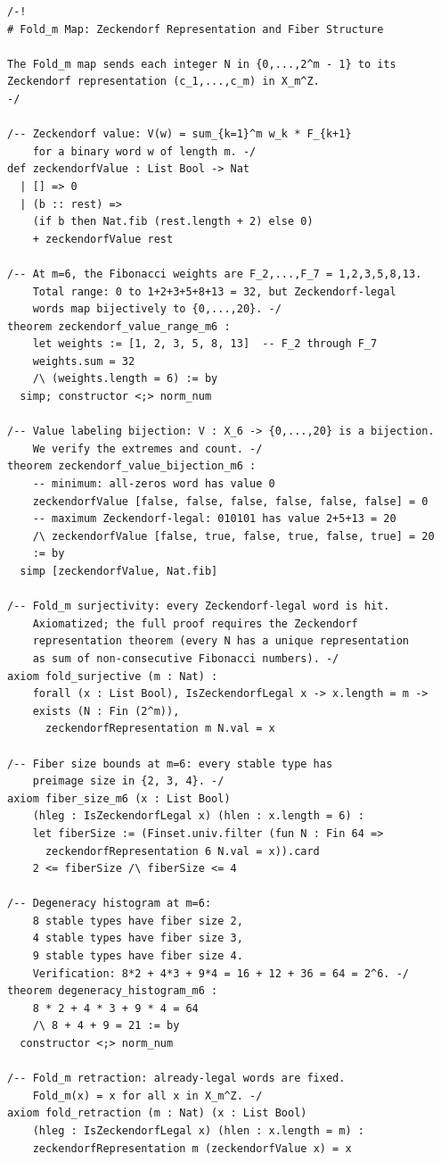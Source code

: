 \begin{lstlisting}[language=Lean4,caption={Fold$_m$ map and fiber structure}]
/-!
# Fold_m Map: Zeckendorf Representation and Fiber Structure

The Fold_m map sends each integer N in {0,...,2^m - 1} to its
Zeckendorf representation (c_1,...,c_m) in X_m^Z.
-/

/-- Zeckendorf value: V(w) = sum_{k=1}^m w_k * F_{k+1}
    for a binary word w of length m. -/
def zeckendorfValue : List Bool -> Nat
  | [] => 0
  | (b :: rest) =>
    (if b then Nat.fib (rest.length + 2) else 0)
    + zeckendorfValue rest

/-- At m=6, the Fibonacci weights are F_2,...,F_7 = 1,2,3,5,8,13.
    Total range: 0 to 1+2+3+5+8+13 = 32, but Zeckendorf-legal
    words map bijectively to {0,...,20}. -/
theorem zeckendorf_value_range_m6 :
    let weights := [1, 2, 3, 5, 8, 13]  -- F_2 through F_7
    weights.sum = 32
    /\ (weights.length = 6) := by
  simp; constructor <;> norm_num

/-- Value labeling bijection: V : X_6 -> {0,...,20} is a bijection.
    We verify the extremes and count. -/
theorem zeckendorf_value_bijection_m6 :
    -- minimum: all-zeros word has value 0
    zeckendorfValue [false, false, false, false, false, false] = 0
    -- maximum Zeckendorf-legal: 010101 has value 2+5+13 = 20
    /\ zeckendorfValue [false, true, false, true, false, true] = 20
    := by
  simp [zeckendorfValue, Nat.fib]

/-- Fold_m surjectivity: every Zeckendorf-legal word is hit.
    Axiomatized; the full proof requires the Zeckendorf
    representation theorem (every N has a unique representation
    as sum of non-consecutive Fibonacci numbers). -/
axiom fold_surjective (m : Nat) :
    forall (x : List Bool), IsZeckendorfLegal x -> x.length = m ->
    exists (N : Fin (2^m)),
      zeckendorfRepresentation m N.val = x

/-- Fiber size bounds at m=6: every stable type has
    preimage size in {2, 3, 4}. -/
axiom fiber_size_m6 (x : List Bool)
    (hleg : IsZeckendorfLegal x) (hlen : x.length = 6) :
    let fiberSize := (Finset.univ.filter (fun N : Fin 64 =>
      zeckendorfRepresentation 6 N.val = x)).card
    2 <= fiberSize /\ fiberSize <= 4

/-- Degeneracy histogram at m=6:
    8 stable types have fiber size 2,
    4 stable types have fiber size 3,
    9 stable types have fiber size 4.
    Verification: 8*2 + 4*3 + 9*4 = 16 + 12 + 36 = 64 = 2^6. -/
theorem degeneracy_histogram_m6 :
    8 * 2 + 4 * 3 + 9 * 4 = 64
    /\ 8 + 4 + 9 = 21 := by
  constructor <;> norm_num

/-- Fold_m retraction: already-legal words are fixed.
    Fold_m(x) = x for all x in X_m^Z. -/
axiom fold_retraction (m : Nat) (x : List Bool)
    (hleg : IsZeckendorfLegal x) (hlen : x.length = m) :
    zeckendorfRepresentation m (zeckendorfValue x) = x
\end{lstlisting}

